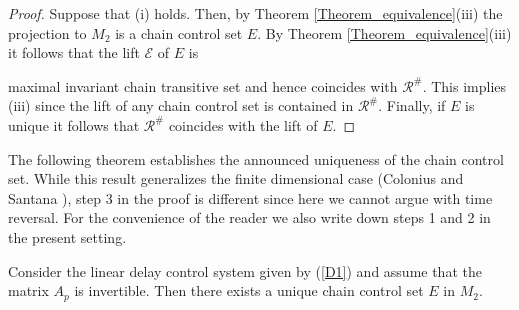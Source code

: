 \documentclass{siamltex}%
\begin{document}
\begin{proof}
Suppose that (i) holds. Then, by Theorem \ref{Theorem_equivalence}(iii) the
projection to $M_{2}$ is a chain control set $E$. By Theorem
\ref{Theorem_equivalence}(iii) it follows that the lift $\mathcal{E}$ of $E$ is

maximal invariant chain transitive set and hence coincides with $\mathcal{R}%
^{\#}$. This implies (iii) since the lift of any chain control set is
contained in $\mathcal{R}^{\#}$. Finally, if $E$ is unique it follows that
$\mathcal{R}^{\#}$ coincides with the lift of $E$.
\end{proof}

The following theorem establishes the announced uniqueness of the chain
control set. While this result generalizes the finite dimensional case
(Colonius and Santana \cite[Theorem 29]{ColS24}), step 3 in the proof is
different since here we cannot argue with time reversal. For the convenience
of the reader we also write down steps 1 and 2 in the present setting.

\begin{theorem}
\label{Theorem_ccs1}Consider the linear delay control system given by
(\ref{D1}) and assume that the matrix $A_{p}$ is invertible. Then there exists
a unique chain control set $E$ in $M_{2}$.
\end{theorem}
\end{document}
